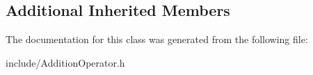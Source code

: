 \subsection*{Additional Inherited Members}


The documentation for this class was generated from the following file\+:\begin{DoxyCompactItemize}
\item 
include/Addition\+Operator.\+h\end{DoxyCompactItemize}
